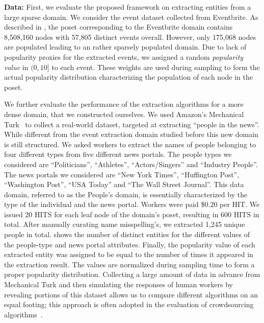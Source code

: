 \vspace{2pt}\noindent\textbf{Data:} First, we evaluate the proposed framework on extracting entities from a large sparse domain. We consider the event dataset collected from Eventbrite. As described in , the poset corresponding to the Eventbrite domain contains 8,508,160 nodes with 57,805 distinct events overall. However, only 175,068 nodes are populated leading to an rather sparsely populated domain. Due to lack of popularity proxies for the extracted events, we assigned a random {\em popularity value} in $(0,10]$ to each event. These weights are used during sampling to form the actual popularity distribution characterizing the population of each node in the poset. 

We further evaluate the performance of the extraction algorithms for a more dense domain, that we constructed ourselves. We used Amazon's Mechanical Turk~\cite{mturk} to collect a real-world dataset, targeted at extracting ``people in the news''. While different from the event extraction domain studied before this new domain is still structured. We asked workers to extract the names of people belonging to four different types from five different news portals. The people types we considered are ``Politicians'', ``Athletes'', ``Actors/Singers'' and ``Industry People''. The news portals we considered are ``New York Times'', ``Huffington Post'', ``Washington Post'', ``USA  Today'' and ``The Wall Street Journal''. This data domain, referred to as the People's domain, is essentially characterized by the type of the individual and the news portal. Workers were paid \$0.20 per HIT. We issued 20 HITS for each leaf node of the domain's poset, resulting in 600 HITS in total. After manually curating name misspelling's, we extracted 1,245 unique people in total.  shows the number of distinct entities for the different values of the people-type and news portal attributes. Finally, the popularity value of each extracted entity was assigned to be equal to the number of times it appeared in the extraction result. The values are normalized during sampling time to form a proper popularity distribution. Collecting a large amount of data in advance from Mechanical Turk and then simulating the responses of human workers by revealing portions of this dataset allows us to compare different algorithms on an equal footing; this approach is often adopted in the evaluation of crowdsourcing algorithms~\cite{DBLP:journals/pvldb/ParameswaranBG0PW14, marcus:2011,trushkowsky:2013}.

